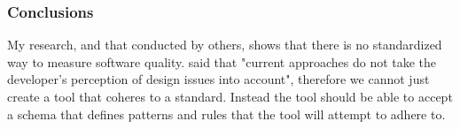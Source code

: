\subsubsection{Conclusions}
My research, and that conducted by others, shows that there is no standardized way to measure software quality. \cite{10.1145/3428029.3428047, 10.1145/2674683.2674702} said that "current approaches do not take the developer's perception of design issues into account", therefore we cannot just create a tool that coheres to a standard. Instead the tool should be able to accept a schema that defines patterns and rules that the tool will attempt to adhere to.
